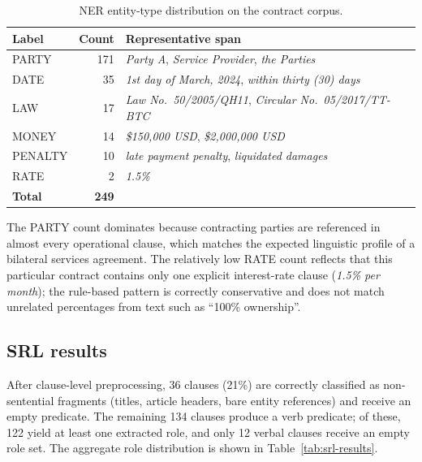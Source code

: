 \documentclass[assignment.tex]{subfiles}
\begin{document}
\begin{table}[H]
    \centering
    \caption{NER entity-type distribution on the contract corpus.}
    \label{tab:ner-results}
    \begin{tabular}{@{}lrl@{}}
        \toprule
        \textbf{Label} & \textbf{Count} & \textbf{Representative span} \\
        \midrule
        PARTY    & 171 & \textit{Party A}, \textit{Service Provider}, \textit{the Parties} \\
        DATE     &  35 & \textit{1st day of March, 2024}, \textit{within thirty (30) days} \\
        LAW      &  17 & \textit{Law No.\ 50/2005/QH11}, \textit{Circular No.\ 05/2017/TT-BTC} \\
        MONEY    &  14 & \textit{\$150,000 USD}, \textit{\$2,000,000 USD} \\
        PENALTY  &  10 & \textit{late payment penalty}, \textit{liquidated damages} \\
        RATE     &   2 & \textit{1.5\%} \\
        \midrule
        \textbf{Total} & \textbf{249} & \\
        \bottomrule
    \end{tabular}
\end{table}

The PARTY count dominates because contracting parties are referenced in almost
every operational clause, which matches the expected linguistic profile of a
bilateral services agreement.  The relatively low RATE count reflects that
this particular contract contains only one explicit interest-rate clause
(\textit{1.5\% per month}); the rule-based pattern is correctly conservative
and does not match unrelated percentages from text such as ``100\%
ownership''.

\subsection{SRL results}

After clause-level preprocessing, 36 clauses (21\%) are correctly classified
as non-sentential fragments (titles, article headers, bare entity
references) and receive an empty predicate.  The remaining 134 clauses
produce a verb predicate; of these, 122 yield at least one extracted role,
and only 12 verbal clauses receive an empty role set.  The aggregate role
distribution is shown in Table~\ref{tab:srl-results}.
\end{document}
